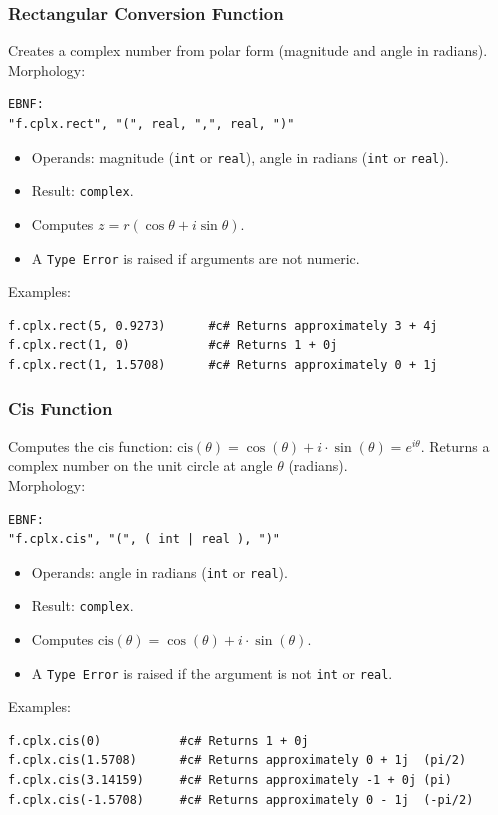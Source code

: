 \subsubsection{Rectangular Conversion Function}
Creates a complex number from polar form (magnitude and angle in radians). \\
Morphology:
\begin{verbatim}
EBNF:
"f.cplx.rect", "(", real, ",", real, ")"
\end{verbatim}
\begin{itemize}
\item Operands: magnitude (\texttt{int} or \texttt{real}), angle in radians (\texttt{int} or \texttt{real}).
\item Result: \texttt{complex}.
\item Computes $z = r(\cos\theta + i\sin\theta)$.
\item A \texttt{Type Error} is raised if arguments are not numeric.
\end{itemize}
Examples:
\begin{verbatim}
f.cplx.rect(5, 0.9273)      #c# Returns approximately 3 + 4j
f.cplx.rect(1, 0)           #c# Returns 1 + 0j
f.cplx.rect(1, 1.5708)      #c# Returns approximately 0 + 1j
\end{verbatim}

\subsubsection{Cis Function}
Computes the cis function: $\text{cis}(\theta) = \cos(\theta) + i \cdot \sin(\theta) = e^{i\theta}$. Returns a complex number on the unit circle at angle $\theta$ (radians). \\
Morphology:
\begin{verbatim}
EBNF:
"f.cplx.cis", "(", ( int | real ), ")"
\end{verbatim}
\begin{itemize}
\item Operands: angle in radians (\texttt{int} or \texttt{real}).
\item Result: \texttt{complex}.
\item Computes $\text{cis}(\theta) = \cos(\theta) + i \cdot \sin(\theta)$.
\item A \texttt{Type Error} is raised if the argument is not \texttt{int} or \texttt{real}.
\end{itemize}
Examples:
\begin{verbatim}
f.cplx.cis(0)           #c# Returns 1 + 0j
f.cplx.cis(1.5708)      #c# Returns approximately 0 + 1j  (pi/2)
f.cplx.cis(3.14159)     #c# Returns approximately -1 + 0j (pi)
f.cplx.cis(-1.5708)     #c# Returns approximately 0 - 1j  (-pi/2)
\end{verbatim}

